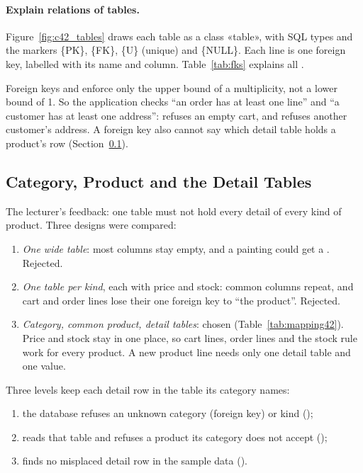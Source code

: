\paragraph{Explain relations of tables.} Figure~\ref{fig:c42_tables} draws each table as a class «table», with SQL
types and the markers \{PK\}, \{FK\}, \{U\} (unique) and \{NULL\}. Each line is one foreign key, labelled with its
name and column. Table~\ref{tab:fks} explains all \nFks{}.




Foreign keys and  enforce only the upper bound of a multiplicity, not a lower bound of 1. So the
application checks ``an order has at least one line'' and ``a customer has at least one address'':
 refuses an empty cart, and  refuses another customer's
address. A foreign key also cannot say which detail table holds a product's row (Section~\ref{sec:4.2.cat}).

\subsection{Category, Product and the Detail Tables}\label{sec:4.2.cat}

The lecturer's feedback: one  table must not hold every detail of every kind of product. Three designs
were compared:
\begin{enumerate}
\item \emph{One wide table}: most columns stay empty, and a painting could get a . Rejected.
\item \emph{One table per kind}, each with price and stock: common columns repeat, and cart and order lines lose
their one foreign key to ``the product''. Rejected.
\item \emph{Category, common product, detail tables}: chosen (Table~\ref{tab:mapping42}). Price and stock stay in
one place, so cart lines, order lines and the stock rule work for every product. A new product line needs only one
detail table and one  value.
\end{enumerate}

Three levels keep each detail row in the table its category names:
\begin{enumerate}
\item the database refuses an unknown category (foreign key) or kind ();
\item {} reads that table and refuses a product its category does not accept
();
\item {} finds no misplaced detail row in the sample data ().
\end{enumerate}


